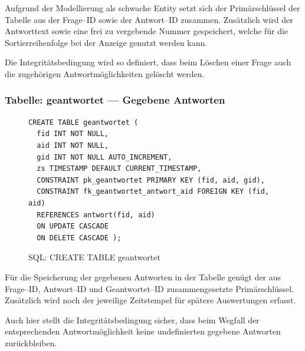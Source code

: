 Aufgrund der Modellierung als schwache Entity setzt sich der Primärschlüssel der Tabelle  aus der Frage--ID sowie der Antwort--ID zusammen. Zusätzlich wird der Antworttext sowie eine frei zu vergebende Nummer gespeichert, welche für die Sortierreihenfolge bei der Anzeige genutzt werden kann.

Die Integritätsbedingung wird so definiert, dass beim Löschen einer Frage auch die zugehörigen Antwortmöglichkeiten gelöscht werden.

\subsubsection{Tabelle: geantwortet --- Gegebene Antworten}
\begin{figure}[H]
\begin{spacing}{1.0}
\begin{verbatim}
CREATE TABLE geantwortet (
  fid INT NOT NULL,
  aid INT NOT NULL,
  gid INT NOT NULL AUTO_INCREMENT,
  zs TIMESTAMP DEFAULT CURRENT_TIMESTAMP,
  CONSTRAINT pk_geantwortet PRIMARY KEY (fid, aid, gid),
  CONSTRAINT fk_geantwortet_antwort_aid FOREIGN KEY (fid, aid) 
  REFERENCES antwort(fid, aid) 
  ON UPDATE CASCADE 
  ON DELETE CASCADE );
\end{verbatim}
\caption{SQL: CREATE TABLE geantwortet}
\label{sql:tblgeantwortet}
\end{spacing}
\end{figure}

Für die Speicherung der gegebenen Antworten in der Tabelle  genügt der aus Frage--ID, Antwort--ID und Geantwortet--ID zusammengesetzte Primärschlüssel. Zusätzlich wird noch der jeweilige Zeitstempel für spätere Auswertungen erfasst.

Auch hier stellt die Integritätsbedingung sicher, dass beim Wegfall der entsprechenden Antwortmöglichkeit keine undefinierten gegebene Antworten zurückbleiben.
